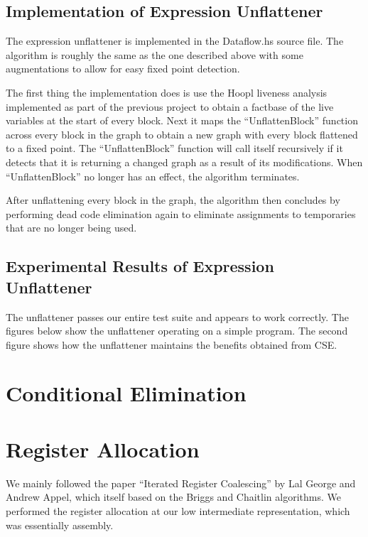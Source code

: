 \documentclass[11pt]{article}
\begin{document}
\subsection{Implementation of Expression Unflattener}

The expression unflattener is implemented in the Dataflow.hs source
file. The algorithm is roughly the same as the one described above
with some augmentations to allow for easy fixed point detection.

The first thing the implementation does is use the Hoopl liveness
analysis implemented as part of the previous project to obtain a
factbase of the live variables at the start of every block. Next it
maps the ``UnflattenBlock'' function across every block in the graph
to obtain a new graph with every block flattened to a fixed point. The
``UnflattenBlock'' function will call itself recursively if it detects
that it is returning a changed graph as a result of its
modifications. When ``UnflattenBlock'' no longer has an effect, the
algorithm terminates.

After unflattening every block in the graph, the algorithm then
concludes by performing dead code elimination again to eliminate
assignments to temporaries that are no longer being used.

\subsection{Experimental Results of Expression Unflattener}

The unflattener passes our entire test suite and appears to work
correctly. The figures below show the unflattener operating on a
simple program. The second figure shows how the unflattener maintains
the benefits obtained from CSE. 


\section {Conditional Elimination} 


\section {Register Allocation}

We mainly followed the paper ``Iterated Register Coalescing'' by Lal
George and Andrew Appel, which itself based on the Briggs and Chaitlin
algorithms.  We performed the register allocation at our low
intermediate representation, which was essentially assembly.
\end{document}
